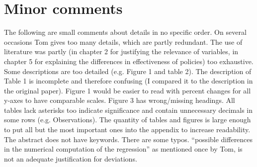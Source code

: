 \documentclass[11pt]{article}
\begin{document}
\section{Minor comments}
The following are small comments about details in no specific order. On several occasions Tom gives too many details, which are partly redundant. The use of literature was partly (in chapter 2 for justifying the relevance of variables, in chapter 5 for explaining the differences in effectiveness of policies) too exhaustive. Some descriptions are too detailed (e.g. Figure 1 and table 2). The description of Table 1 is incomplete and therefore confusing (I compared it to the description in the original paper). Figure 1 would be easier to read with percent changes for all y-axes to have comparable scales. Figure 3 has wrong/missing headings. All tables lack asterisks too indicate significance and contain unnecessary decimals in some rows (e.g. Observations). The quantity of tables and figures is large enough to put all but the most important ones into the appendix to increase readability. The abstract does not have keywords. There are some typos. “possible differences in the numerical computation of the regression” as mentioned once by Tom, is not an adequate justification for deviations.


\end{document}
